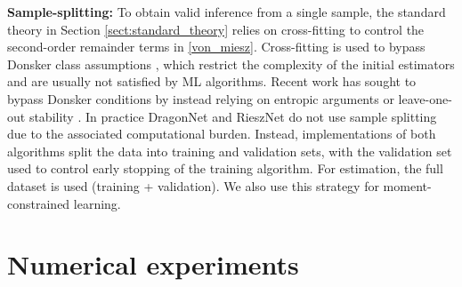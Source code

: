 
\textbf{Sample-splitting:} To obtain valid inference from a single sample, the standard theory in Section \ref{sect:standard_theory} relies on cross-fitting to control the second-order remainder terms in \eqref{von_miesz}. Cross-fitting is used to bypass Donsker class assumptions \citep{Bickel1982,van_der_laan_cross-validated_2011,Chernozhukov2018}, which restrict the complexity of the initial estimators and are usually not satisfied by ML algorithms. Recent work has sought to bypass Donsker conditions by instead relying on entropic arguments \citep{VanDeGeer2014} or leave-one-out stability \citep{Chen2022}. In practice DragonNet and RieszNet do not use sample splitting due to the associated computational burden. Instead, implementations of both algorithms split the data into training and validation sets, with the validation set used to control early stopping of the training algorithm. For estimation, the full dataset is used (training + validation). We also use this strategy for moment-constrained learning.


\section{Numerical experiments} \label{sec:num-exp}

